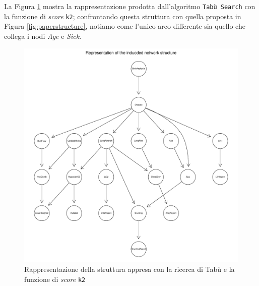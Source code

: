 La Figura \ref{fig:inducedstructure} mostra la rappresentazione prodotta dall'algoritmo \texttt{Tabù Search} con la funzione di \textit{score} \texttt{k2}; confrontando questa struttura con quella proposta in Figura \ref{fig:paperstructure}, notiamo come l'unico arco differente sia quello che collega i nodi \textit{Age} e \textit{Sick}.

\begin{figure}
	\centering
	\includegraphics[width=.9\linewidth]{images/induced_structure}
	\caption{Rappresentazione della struttura appresa con la ricerca di Tabù e la funzione di \textit{score} \texttt{k2}}
	\label{fig:inducedstructure}
\end{figure}

\newpage
